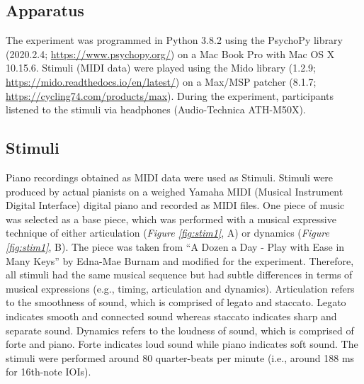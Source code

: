 \documentclass[
  man,floatsintext]{apa6}
\begin{document}
\hypertarget{apparatus}{%
\subsection{Apparatus}\label{apparatus}}

The experiment was programmed in Python 3.8.2 using the PsychoPy library (2020.2.4; \url{https://www.psychopy.org/}) on a Mac Book Pro with Mac OS X 10.15.6. Stimuli (MIDI data) were played using the Mido library (1.2.9; \url{https://mido.readthedocs.io/en/latest/}) on a Max/MSP patcher (8.1.7; \url{https://cycling74.com/products/max}). During the experiment, participants listened to the stimuli via headphones (Audio-Technica ATH-M50X).

\hypertarget{stimuli}{%
\subsection{Stimuli}\label{stimuli}}

Piano recordings obtained as MIDI data were used as Stimuli. Stimuli were produced by actual pianists on a weighed Yamaha MIDI (Musical Instrument Digital Interface) digital piano and recorded as MIDI files. One piece of music was selected as a base piece, which was performed with a musical expressive technique of either articulation (\emph{Figure \ref{fig:stim1}}, A) or dynamics (\emph{Figure \ref{fig:stim1}}, B). The piece was taken from ``A Dozen a Day - Play with Ease in Many Keys'' by Edna-Mae Burnam and modified for the experiment. Therefore, all stimuli had the same musical sequence but had subtle differences in terms of musical expressions (e.g., timing, articulation and dynamics). Articulation refers to the smoothness of sound, which is comprised of legato and staccato. Legato indicates smooth and connected sound whereas staccato indicates sharp and separate sound. Dynamics refers to the loudness of sound, which is comprised of forte and piano. Forte indicates loud sound while piano indicates soft sound. The stimuli were performed around 80 quarter-beats per minute (i.e., around 188 ms for 16th-note IOIs).
\end{document}
